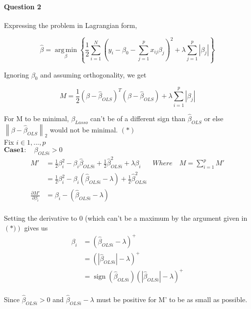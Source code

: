 \documentclass{article}
\begin{document}
\paragraph{Question 2}
Expressing the problem in Lagrangian form,

\begin{equation*}
\hat{\beta} = \operatorname*{arg\,min}_\beta \left\{\frac{1}{2}\sum_{i=1}^N\left(y_i - \beta_0 - \sum_{j=1}^p x_{ij} \beta_j \right)^2 + \lambda\sum_{j=1}^p | \beta_j | \right\}
\end{equation*}

Ignoring \(\beta_0\) and assuming orthogonality, we get

\begin{equation*}
M = \frac{1}{2}(\beta - \hat{\beta}_{OLS})^T(\beta - \hat{\beta}_{OLS}) + \lambda\sum_{i=1}^p|\beta_j|
\end{equation*}

For M to be minimal, \(\beta_{Lasso}\) can't be of a different sign than \(\hat{\beta}_{OLS}\) or else \(\left\|\beta - \hat{\beta}_{OLS}\right\|_2\) would not be minimal. \(\left(*\right)\)
\\
Fix \(i \in 1,...,p\)
\\
\(\mathbf{Case 1:} \quad \beta_{OLSi} > 0 \)
\\
\begin{align*}
M' & = \frac{1}{2}\beta_i^2 - \beta_i \hat{\beta}_{OLSi} + \frac{1}{2}\hat{\beta}_{OLSi}^2 + \lambda \beta_i & Where \quad M = \sum_{i=1}^pM'
\\
& = \frac{1}{2}\beta_i^2 - \beta_i \left(\hat{\beta}_{OLSi} - \lambda \right) + \frac{1}{2}\hat{\beta}_{OLSi}^2
\\
\frac{\partial M'}{\partial \beta_i} & = \beta_i - \left(\hat{\beta}_{OLSi} - \lambda \right)
\\
\end{align*}

Setting the derivative to 0 (which can't be a maximum by the argument given in \(\left(*)\right)\)  gives us 
\begin{align*}
\beta_i & = \left(\hat{\beta}_{OLSi} - \lambda \right)^+
\\
& = \left(|\hat{\beta}_{OLSi}| - \lambda \right)^+
\\
& = \operatorname{sign} \left(\hat{\beta}_{OLSi}\right) \left(|\hat{\beta}_{OLSi}| - \lambda \right)^+
\\
\end{align*}

Since \(\hat{\beta}_{OLSi} > 0 \) and \( \hat{\beta}_{OLSi} - \lambda \) must be positive for M' to be as small as possible. \\
\end{document}
